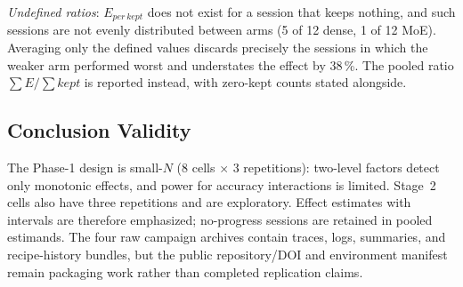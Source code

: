 \emph{Undefined ratios}: $E_{\mathit{per\,kept}}$ does not exist for a session that keeps nothing, and such sessions are not evenly distributed between arms (5 of 12 dense, 1 of 12 MoE). Averaging only the defined values discards precisely the sessions in which the weaker arm performed worst and understates the effect by 38\,\%. The pooled ratio $\sum E / \sum \mathit{kept}$ is reported instead, with zero-kept counts stated alongside.

\subsection{Conclusion Validity}
The Phase-1 design is small-$N$ (8 cells $\times$ 3 repetitions): two-level factors detect only monotonic effects, and power for accuracy interactions is limited. Stage~2 cells also have three repetitions and are exploratory. Effect estimates with intervals are therefore emphasized; no-progress sessions are retained in pooled estimands. The four raw campaign archives contain traces, logs, summaries, and recipe-history bundles, but the public repository/DOI and environment manifest remain packaging work rather than completed replication claims.
